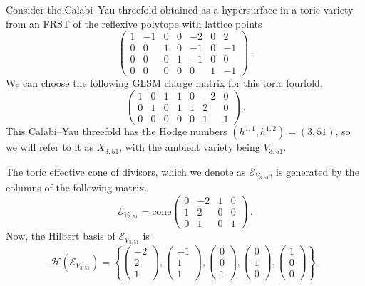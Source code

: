\documentclass[11pt,dvipsnames]{article}
\theoremstyle{definition}
\begin{document}
Consider the Calabi--Yau threefold obtained as a hypersurface in a toric variety from an FRST of the reflexive polytope with lattice points
\begin{equation}
    \begin{pmatrix}
        1&-1&0&0&-2&0&2\\
        0&0&1&0&-1&0&-1\\
        0&0&0&1&-1&0&0\\
        0&0&0&0&0&1&-1
    \end{pmatrix}\,.
\end{equation}
We can choose the following GLSM charge matrix for this toric fourfold.
\begin{equation}
    \label{eq:351_charge_matrix}
    \begin{pmatrix}
        1 & 0 & 1 & 1 & 0& -2&  0\\
         0  &1 & 0  &1  &1&  2 & 0\\
         0  &0 & 0  &0  &0  &1 & 1
    \end{pmatrix}\,.
\end{equation}
This Calabi--Yau threefold has the Hodge numbers $(h^{1,1},h^{1,2})=(3,51)$, so we will refer to it as $X_{3,51}$, with the ambient variety being $V_{3,51}$.

The toric effective cone of divisors, which we denote as $\mathcal{E}_{V_{3,51}}$, is generated by the columns of the following matrix.
\begin{equation}
\mathcal{E}_{V_{3,51}} = \text{cone}\begin{pmatrix}
0 & -2 & 1 & 0\\
1&2&0&0\\
0&1&0&1
\end{pmatrix}\,.
\end{equation}
Now, the Hilbert basis of $\mathcal{E}_{V_{3,51}}$ is
\begin{equation}
    \mathcal{H}(\mathcal{E}_{V_{3,51}}) =\left\{\begin{pmatrix}
        -2\\2\\1
    \end{pmatrix},\begin{pmatrix}
        -1\\1\\1
    \end{pmatrix},\begin{pmatrix}
        0\\0\\1
    \end{pmatrix},\begin{pmatrix}
        0\\1\\0
    \end{pmatrix},\begin{pmatrix}
        1\\0\\0
    \end{pmatrix}\right\}\,.
\end{equation}
\end{document}
